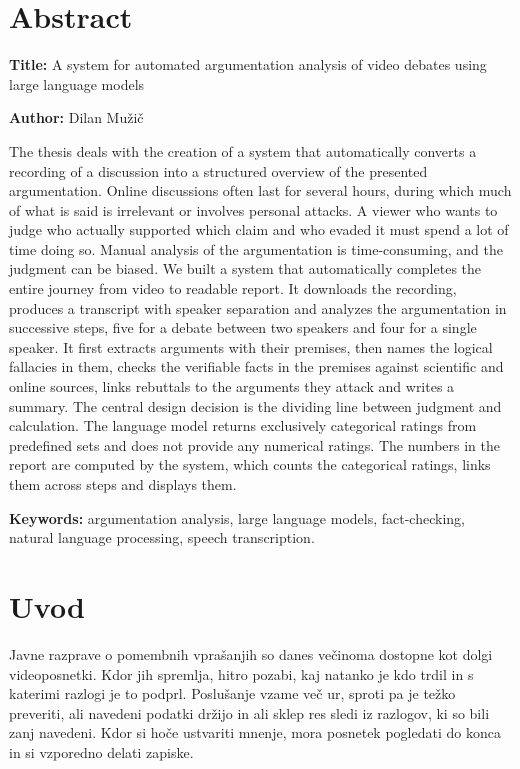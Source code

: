\documentclass[a4paper, 12pt]{book}
\newcommand{\ttitleEn}{A system for automated argumentation analysis of video debates using large language models}
\newcommand{\tauthor}{Dilan Mužič}
\newcommand{\tkeywordsEn}{argumentation analysis, large language models, fact-checking, natural language processing, speech transcription}
\newcommand{\clearemptydoublepage}{\newpage{\pagestyle{empty}\cleardoublepage}}
\begin{document}
\chapter*{Abstract}

\noindent\textbf{Title:} \ttitleEn
\bigskip

\noindent\textbf{Author:} \tauthor
\bigskip

\noindent
The thesis deals with the creation of a system that automatically converts a recording of a discussion into a structured overview of the presented argumentation. Online discussions often last for several hours, during which much of what is said is irrelevant or involves personal attacks. A viewer who wants to judge who actually supported which claim and who evaded it must spend a lot of time doing so. Manual analysis of the argumentation is time-consuming, and the judgment can be biased. We built a system that automatically completes the entire journey from video to readable report. It downloads the recording, produces a transcript with speaker separation and analyzes the argumentation in successive steps, five for a debate between two speakers and four for a single speaker. It first extracts arguments with their premises, then names the logical fallacies in them, checks the verifiable facts in the premises against scientific and online sources, links rebuttals to the arguments they attack and writes a summary. The central design decision is the dividing line between judgment and calculation. The language model returns exclusively categorical ratings from predefined sets and does not provide any numerical ratings. The numbers in the report are computed by the system, which counts the categorical ratings, links them across steps and displays them.

\bigskip

\noindent\textbf{Keywords:} \tkeywordsEn.
\clearemptydoublepage

\mainmatter
\setcounter{page}{1}
\pagestyle{fancy}


\chapter{Uvod}
\label{ch:uvod}

Javne razprave o pomembnih vprašanjih so danes večinoma dostopne kot dolgi
videoposnetki. Kdor jih spremlja, hitro pozabi, kaj natanko je kdo trdil in s
katerimi razlogi je to podprl. Poslušanje vzame več ur, sproti pa je težko
preveriti, ali navedeni podatki držijo in ali sklep res sledi iz razlogov, ki so
bili zanj navedeni. Kdor si hoče ustvariti mnenje, mora posnetek pogledati do
konca in si vzporedno delati zapiske.
\end{document}
